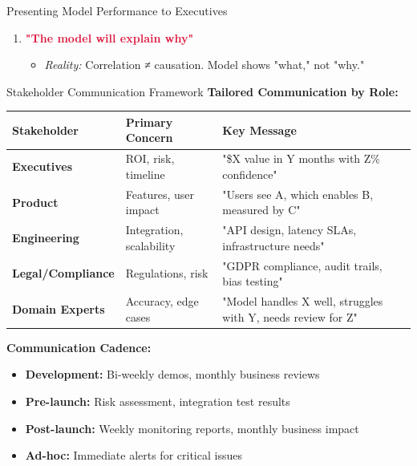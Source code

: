 \begin{frame}{Presenting Model Performance to Executives}
\begin{enumerate}
\item \textcolor{crimson}{\textbf{"The model will explain why"}}
  \begin{itemize}
  \item \textit{Reality:} Correlation ≠ causation. Model shows "what," not "why."
  \end{itemize}
\end{enumerate}
\end{frame}

\begin{frame}{Stakeholder Communication Framework}
\textbf{Tailored Communication by Role:}

\begin{table}
\centering
\small
\begin{tabular}{p{2cm}p{3.5cm}p{5cm}}
\toprule
\textbf{Stakeholder} & \textbf{Primary Concern} & \textbf{Key Message} \\
\midrule
\textbf{Executives} & ROI, risk, timeline & "\$X value in Y months with Z\% confidence" \\
\midrule
\textbf{Product} & Features, user impact & "Users see A, which enables B, measured by C" \\
\midrule
\textbf{Engineering} & Integration, scalability & "API design, latency SLAs, infrastructure needs" \\
\midrule
\textbf{Legal/Compliance} & Regulations, risk & "GDPR compliance, audit trails, bias testing" \\
\midrule
\textbf{Domain Experts} & Accuracy, edge cases & "Model handles X well, struggles with Y, needs review for Z" \\
\bottomrule
\end{tabular}
\end{table}

\vspace{0.3cm}
\textbf{Communication Cadence:}
\begin{itemize}
\item \textbf{Development:} Bi-weekly demos, monthly business reviews
\item \textbf{Pre-launch:} Risk assessment, integration test results
\item \textbf{Post-launch:} Weekly monitoring reports, monthly business impact
\item \textbf{Ad-hoc:} Immediate alerts for critical issues
\end{itemize}
\end{frame}

